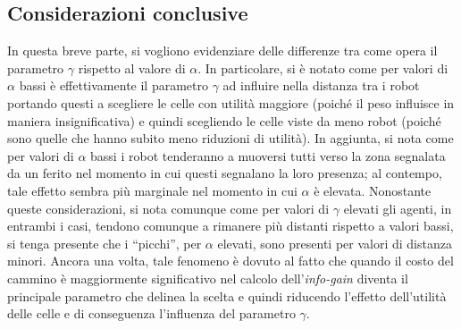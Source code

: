 \subsection{Considerazioni conclusive}
In questa breve parte, si vogliono evidenziare delle differenze tra come opera il parametro $\gamma$ rispetto al valore di $\alpha$.
In particolare, si è notato come per valori di $\alpha$ bassi è effettivamente il parametro $\gamma$ ad influire nella distanza tra i robot portando questi a scegliere le celle con utilità maggiore (poiché il peso influisce in maniera insignificativa) e quindi scegliendo le celle viste da meno robot (poiché sono quelle che hanno subito meno riduzioni di utilità).
In aggiunta, si nota come per valori di $\alpha$ bassi i robot tenderanno a muoversi tutti verso la zona segnalata da un ferito nel momento in cui questi segnalano la loro presenza; al contempo, tale effetto sembra più marginale nel momento in cui $\alpha$ è elevata.
Nonostante queste considerazioni, si nota comunque come per valori di $\gamma$ elevati gli agenti, in entrambi i casi, tendono comunque a rimanere più distanti rispetto a valori bassi, si tenga presente che i “picchi”, per $\alpha$ elevati, sono presenti per valori di distanza minori.
Ancora una volta, tale fenomeno è dovuto al fatto che quando il costo del cammino è maggiormente significativo nel calcolo dell'\textit{info-gain} diventa il principale parametro che delinea la scelta e quindi riducendo l'effetto dell'utilità delle celle e di conseguenza l'influenza del parametro $\gamma$.
